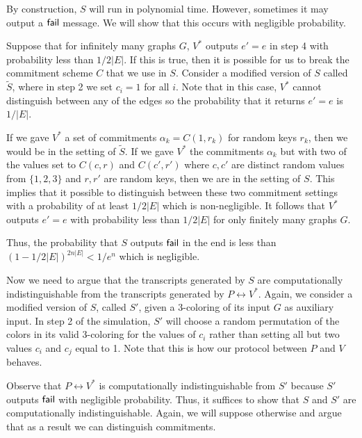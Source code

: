 \documentclass[12pt]{tufte-book}
\begin{document}
By construction, $S$ will run in polynomial time. However, sometimes it may output a $\sf{fail}$ message. We will show that this occurs with negligible probability.

Suppose that for infinitely many graphs $G$, $V^*$ outputs $e' = e$ in step 4 with probability less than $1/2|E|$. If this is true, then it is possible for us to break the commitment scheme $C$ that we use in $S$. Consider a modified version of $S$ called $\tilde{S}$, where in step 2 we set $c_i = 1$ for all $i$. Note that in this case, $V^*$ cannot distinguish between any of the edges so the probability that it returns $e' = e$ is $1/|E|$.

If we gave $V^*$ a set of commitments $\alpha_k = C(1, r_k)$ for random keys $r_k$, then we would be in the setting of $\tilde{S}$. If we gave $V^*$ the commitments $\alpha_k$ but with two of the values set to $C(c, r)$ and $C(c', r')$ where $c, c'$ are distinct random values from $\{ 1, 2, 3 \}$ and $r, r'$ are random keys, then we are in the setting of $S$. This implies that it possible to distinguish between these two commitment settings with a probability of at least $1/2|E|$ which is non-negligible. It follows that $V^*$ outputs $e' = e$ with probability less than $1/2|E|$ for only finitely many graphs $G$.

Thus, the probability that $S$ outputs $\sf{fail}$ in the end is less than $(1 - 1/2|E|)^{2n|E|} < 1/e^n$ which is negligible.

Now we need to argue that the transcripts generated by $S$ are computationally indistinguishable from the transcripts generated by $P \leftrightarrow V^*$. Again, we consider a modified version of $S$, called $S'$, given a 3-coloring of its input $G$ as auxiliary input. In step 2 of the simulation, $S'$ will choose a random permutation of the colors in its valid 3-coloring for the values of $c_i$ rather than setting all but two values $c_i$ and $c_j$ equal to 1. Note that this is how our protocol between $P$ and $V$ behaves.

Observe that $P \leftrightarrow V^*$ is computationally indistinguishable from $S'$ because $S'$ outputs $\sf{fail}$ with negligible probability. Thus, it suffices to show that $S$ and $S'$ are computationally indistinguishable. Again, we will suppose otherwise and argue that as a result we can distinguish commitments.
\end{document}
